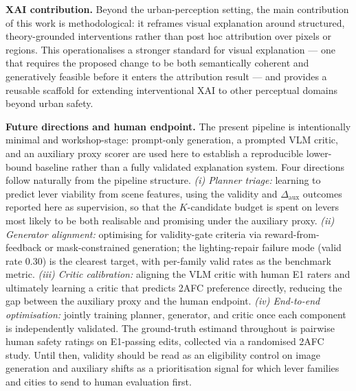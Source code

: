\noindent\textbf{XAI contribution.} Beyond the urban-perception setting, the main contribution of this work is methodological: it reframes visual explanation around structured, theory-grounded interventions rather than post hoc attribution over pixels or regions. This operationalises a stronger standard for visual explanation — one that requires the proposed change to be both semantically coherent and generatively feasible before it enters the attribution result — and provides a reusable scaffold for extending interventional XAI to other perceptual domains beyond urban safety.


\noindent\textbf{Future directions and human endpoint.}
The present pipeline is intentionally minimal and workshop-stage: prompt-only generation, a prompted VLM critic, and an auxiliary proxy scorer are used here to establish a reproducible lower-bound baseline rather than a fully validated explanation system. Four directions follow naturally from the
pipeline structure. \emph{(i) Planner triage:} learning to predict lever
viability from scene features, using the validity and
$\Delta_{\mathrm{aux}}$ outcomes reported here as supervision, so that
the $K$-candidate budget is spent on levers most likely to be both
realisable and promising under the auxiliary proxy. \emph{(ii) Generator alignment:} optimising
for validity-gate criteria via reward-from-feedback or mask-constrained
generation; the lighting-repair failure mode (valid rate 0.30) is the
clearest target, with per-family valid rates as the benchmark metric.
\emph{(iii) Critic calibration:} aligning the VLM critic with human E1
raters and ultimately learning a critic that predicts 2AFC preference
directly, reducing the gap between the auxiliary proxy and the human
endpoint. \emph{(iv) End-to-end optimisation:} jointly training planner,
generator, and critic once each component is independently validated.
The ground-truth estimand throughout is pairwise human safety ratings on
E1-passing edits, collected via a randomised 2AFC study. Until then,
validity should be read as an eligibility control on image generation
and auxiliary shifts as a prioritisation signal for which lever
families and cities to send to human evaluation first.
